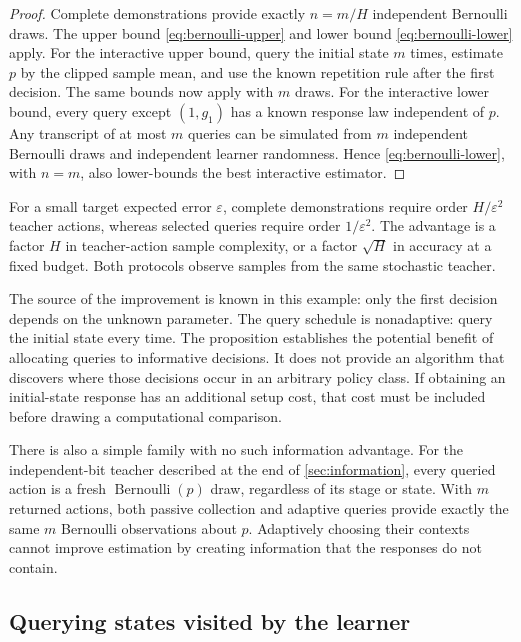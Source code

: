 \documentclass[11pt,twoside]{article}
\theoremstyle{definition}
\theoremstyle{remark}
\begin{document}
\begin{proof}
Complete demonstrations provide exactly $n=m/H$ independent Bernoulli
draws. The upper bound \cref{eq:bernoulli-upper} and lower bound
\cref{eq:bernoulli-lower} apply.
For the interactive upper bound, query the initial state $m$ times,
estimate $p$ by the clipped sample mean, and use the known repetition rule
after the first decision. The same bounds now apply with $m$ draws.
For the interactive lower bound, every query except $(1,g_1)$ has a known
response law independent of $p$. Any transcript of at most $m$ queries can be
simulated from $m$ independent Bernoulli draws and independent learner
randomness. Hence \cref{eq:bernoulli-lower}, with $n=m$, also lower-bounds
the best interactive estimator.
\end{proof}

For a small target expected error $\varepsilon$, complete demonstrations
require order $H/\varepsilon^2$ teacher actions, whereas selected queries
require order $1/\varepsilon^2$. The advantage is a factor $H$ in
teacher-action sample complexity, or a factor $\sqrt H$ in accuracy at
a fixed budget. Both protocols observe samples from the same stochastic
teacher.

The source of the improvement is known in this example: only the first
decision depends on the unknown parameter. The query schedule is
nonadaptive: query the initial state every time. The proposition establishes the
potential benefit of allocating queries to informative decisions. It does
not provide an algorithm that discovers where those decisions occur in an
arbitrary policy class. If obtaining an initial-state response has an
additional setup cost, that cost must be included before drawing a
computational comparison.

There is also a simple family with no such information advantage.
For the independent-bit teacher described at the end of
\cref{sec:information}, every queried action is a fresh
$\operatorname{Bernoulli}(p)$ draw, regardless of its stage or state.
With $m$ returned actions, both passive collection and adaptive queries
provide exactly the same $m$ Bernoulli observations about $p$. Adaptively
choosing their contexts cannot improve estimation by creating information
that the responses do not contain.

\subsection{Querying states visited by the learner}
\end{document}
